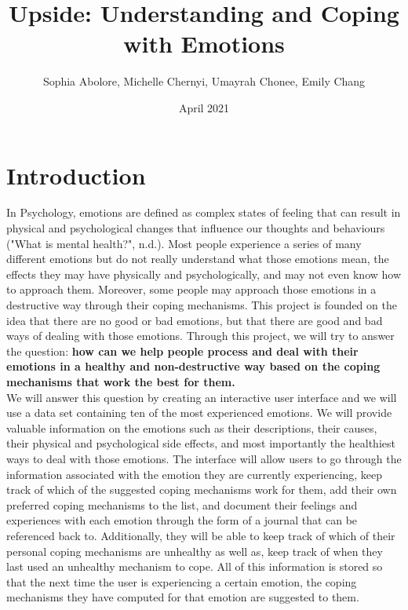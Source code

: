 \documentclass{article}
\title{Upside: Understanding and Coping with Emotions}
\author{Sophia Abolore, Michelle Chernyi, Umayrah Chonee, Emily Chang }
\date{April 2021}
\begin{document}
    \maketitle


    \section{Introduction}

    In Psychology, emotions are defined as complex states of feeling that can result in physical and psychological changes that influence our thoughts and behaviours ("What is mental health?", n.d.). Most people experience a series of many different emotions but do not really understand what those emotions mean, the effects they may have physically and psychologically, and may not even know how to approach them. Moreover, some people may approach those emotions in a destructive way through their coping mechanisms. This project is founded on the idea that there are no good or bad emotions, but that there are good and bad ways of dealing with those emotions. Through this project, we will try to answer the question: {\bf how can we help people process and deal with their emotions in a healthy and non-destructive way based on the coping mechanisms that work the best for them.}\\

    We will answer this question by creating an interactive user interface and we will use a data set containing ten of the most experienced emotions. We will provide valuable information on the emotions such as their descriptions, their causes, their physical and psychological side effects, and most importantly the healthiest ways to deal with those emotions. The interface will allow users to go through the information associated with the emotion they are currently experiencing, keep track of which of the suggested coping mechanisms work for them, add their own preferred coping mechanisms to the list, and document their feelings and experiences with each emotion through the form of a journal that can be referenced back to. Additionally, they will be able to keep track of which of their personal coping mechanisms are unhealthy as well as, keep track of when they last used an unhealthy mechanism to cope. All of this information is stored so that the next time the user is experiencing a certain emotion, the coping mechanisms they have computed for that emotion are suggested to them. \\
\end{document}
